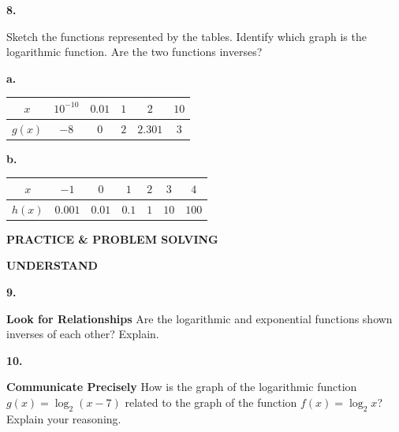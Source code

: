 \documentclass{article}
\newenvironment{practice}[2]{\textbf{#1.}\par}{\par}
\newcommand{\answer}[1]{}
\begin{document}
\begin{practice}{8}{}
Sketch the functions represented by the tables. Identify which graph is the logarithmic function. Are the two functions inverses?

\textbf{a.}
\begin{tabular}{|c|c|c|c|c|c|}
\hline
$x$ & $10^{-10}$ & $0.01$ & $1$ & $2$ & $10$ \\
\hline
$g(x)$ & $-8$ & $0$ & $2$ & $2.301$ & $3$ \\
\hline
\end{tabular}

\textbf{b.}
\begin{tabular}{|c|c|c|c|c|c|c|}
\hline
$x$ & $-1$ & $0$ & $1$ & $2$ & $3$ & $4$ \\
\hline
$h(x)$ & $0.001$ & $0.01$ & $0.1$ & $1$ & $10$ & $100$ \\
\hline
\end{tabular}
\answer{}
\end{practice}

\vspace{2em}
\textbf{PRACTICE \& PROBLEM SOLVING}

\textbf{UNDERSTAND}

\begin{practice}{9}{}
\textbf{Look for Relationships} Are the logarithmic and exponential functions shown inverses of each other? Explain.

\begin{center}
\end{center}
\answer{}
\end{practice}

\begin{practice}{10}{}
\textbf{Communicate Precisely} How is the graph of the logarithmic function $g(x) = \log_2(x-7)$ related to the graph of the function $f(x) = \log_2 x$? Explain your reasoning.
\answer{}
\end{practice}
\end{document}
